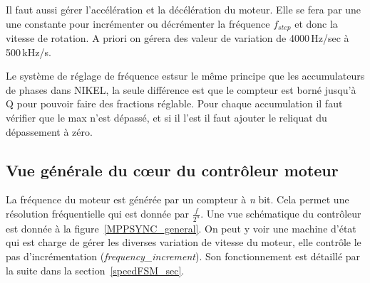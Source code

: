 \documentclass[11pt,a4paper,oneside,onecolumn]{article}
\begin{document}
Il faut aussi gérer l'accélération et la décélération du moteur. Elle se fera par une une constante pour incrémenter ou décrémenter la fréquence $f_{step}$ et donc la vitesse de rotation. A priori on gérera des valeur de variation de 4000\,Hz/sec à 500\,kHz/s.

Le système de réglage de fréquence estsur le même principe que les accumulateurs de phases dans NIKEL, la seule différence est que le compteur est borné jusqu’à Q pour pouvoir faire des fractions réglable. 
Pour chaque accumulation il faut vérifier que le max n'est dépassé, et si il l'est il faut ajouter le reliquat du dépassement à zéro.

\subsection{Vue générale du cœur du contrôleur  moteur}
La fréquence du moteur est générée par un compteur à \emph{n} bit. Cela permet une résolution fréquentielle qui est donnée par $\frac{f}{2^n}$. Une vue schématique du contrôleur est donnée à la figure~\ref{MPPSYNC_general}. On peut y voir une machine d'état qui est charge de gérer les diverses variation de vitesse du moteur, elle contrôle le pas d'incrémentation (\emph{frequency\_increment}). Son fonctionnement est détaillé par la suite dans la section~\ref{speedFSM_sec}.
\end{document}
